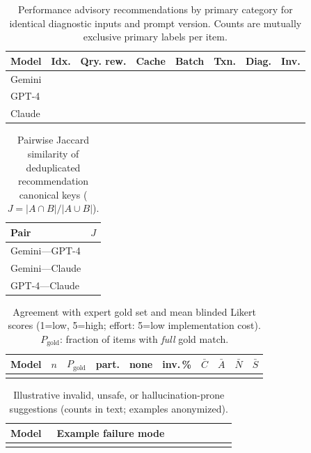 
\begin{table}[t]
\centering
\caption{Performance advisory recommendations by primary category for identical diagnostic inputs and prompt version. Counts are mutually exclusive primary labels per item.}
\label{tab:llm-category-counts}
\begin{tabular}{lccccccc}
\hline
Model & Idx. & Qry. rew. & Cache & Batch & Txn. & Diag. & Inv. \\
\hline
Gemini  &  &  &  &  &  &  &  \\
GPT-4   &  &  &  &  &  &  &  \\
Claude  &  &  &  &  &  &  &  \\
\hline
\end{tabular}
\end{table}

\begin{table}[t]
\centering
\caption{Pairwise Jaccard similarity of deduplicated recommendation canonical keys ($J=|A\cap B|/|A\cup B|$).}
\label{tab:llm-jaccard}
\begin{tabular}{l c}
\hline
Pair & $J$ \\
\hline
Gemini---GPT-4   &  \\
Gemini---Claude  &  \\
GPT-4---Claude   &  \\
\hline
\end{tabular}
\end{table}

\begin{table}[t]
\centering
\caption{Agreement with expert gold set and mean blinded Likert scores (1=low, 5=high; effort: 5=low implementation cost). $P_{\mathrm{gold}}$: fraction of items with \emph{full} gold match.}
\label{tab:llm-human-agreement}
\begin{tabular}{l c c c c c c c c c}
\hline
Model & $n$ & $P_{\mathrm{gold}}$ & part. & none & inv.\,\% & $\bar{C}$ & $\bar{A}$ & $\bar{N}$ & $\bar{S}$ \\
\hline
 &  &  &  &  &  &  &  &  &  \\
\hline
\end{tabular}
\end{table}

\begin{table}[t]
\centering
\caption{Illustrative invalid, unsafe, or hallucination-prone suggestions (counts in text; examples anonymized).}
\label{tab:llm-invalid-examples}
\begin{tabular}{p{0.18\linewidth} p{0.7\linewidth}}
\hline
Model & Example failure mode \\
\hline
 &  \\
\hline
\end{tabular}
\end{table}


